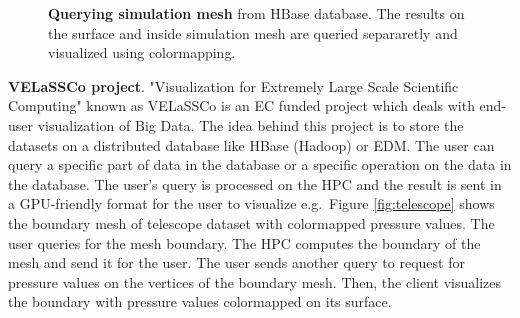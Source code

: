 \documentclass[]{report}
\begin{document}
\begin{figure}[!ht]
	\hfill
	\hfill
	\hfill
	\caption[Getting simulation mesh informaton]{\textbf{Querying simulation mesh} from HBase database. The results on the surface and inside simulation mesh are queried separaretly and visualized using colormapping.}
	\label{fig:sim_meshes}
\end{figure}


\textbf{VELaSSCo project}. "Visualization for Extremely Large Scale Scientific Computing" known as VELaSSCo is an EC funded project which deals with end-user visualization of Big Data. The idea behind this project is to store the datasets on a distributed database like HBase (Hadoop) or EDM. The user can query a specific part of data in the database or a specific operation on the data in the database. The user's query is processed on the HPC and the result is sent in a GPU-friendly format for the user to visualize e.g.~Figure \ref{fig:telescope} shows the boundary mesh of telescope dataset with colormapped pressure values. The user queries for the mesh boundary. The HPC computes the boundary of the mesh and send it for the user. The user sends another query to request for pressure values on the vertices of the boundary mesh. Then, the client visualizes the boundary with pressure values colormapped on its surface.
\end{document}
